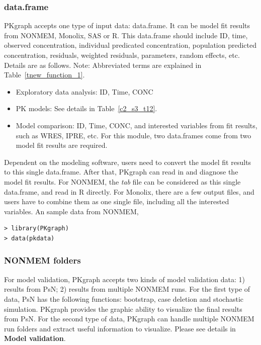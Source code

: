 \documentclass[a4paper]{article}
\begin{document}
\subsubsection{data.frame}
PKgraph accepts one type of input data: data.frame. It can be model fit results from NONMEM, Monolix, SAS or R. This data.frame should include ID, time, observed concentration, individual predicated concentration, population predicted concentration, residuals, weighted residuals, parameters, random effects, etc. Details are as follows. Note: Abbreviated terms are explained in Table~\ref{tnew_function_1}.
\begin{itemize}
	\item Exploratory data analysis: ID, Time, CONC 
	\item PK models: See details in Table~\ref{c2_s3_t12}. 
	\item Model comparison: ID, Time, CONC, and interested variables from fit results, such as WRES, IPRE, etc. For this module, two data.frames come from two model fit results are required.
\end{itemize}
Dependent on the modeling software, users need to convert the model fit results to this single data.frame. After that, PKgraph can read in and diagnose the model fit results. For NONMEM, the \textit{tab} file can be considered as this single data.frame, and read in R directly. For Monolix, there are a few output files, and users have to combine them as one single file, including all the interested variables.
\newline
\newline
An sample data from NONMEM,
\begin{verbatim}
> library(PKgraph)
> data(pkdata)
\end{verbatim}
\subsubsection{NONMEM folders}
For model validation, PKgraph accepts two kinds of model validation data: 1) results from PsN; 2) results from multiple NONMEM runs. For the first type of data, PsN has the following functions: bootstrap, case deletion and stochastic simulation. PKgraph provides the graphic ability to visualize the final results from PsN. For the second type of data, PKgraph can handle multiple NONMEM run folders and extract useful information to visualize.
Please see details in \textbf{Model validation}.
\end{document}
